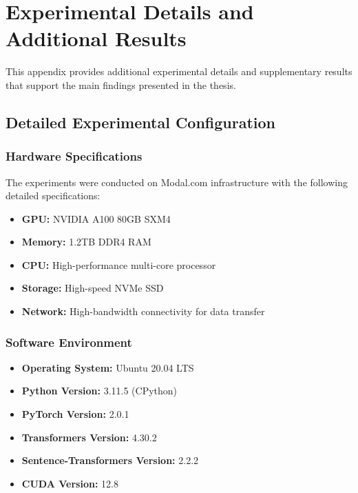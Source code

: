 
\chapter{Experimental Details and Additional Results} %

\label{AppendixA} %


This appendix provides additional experimental details and supplementary results that support the main findings presented in the thesis.

\section{Detailed Experimental Configuration}

\subsection{Hardware Specifications}

The experiments were conducted on Modal.com infrastructure with the following detailed specifications:

\begin{itemize}
\item \textbf{GPU:} NVIDIA A100 80GB SXM4
\item \textbf{Memory:} 1.2TB DDR4 RAM
\item \textbf{CPU:} High-performance multi-core processor
\item \textbf{Storage:} High-speed NVMe SSD
\item \textbf{Network:} High-bandwidth connectivity for data transfer
\end{itemize}

\subsection{Software Environment}

\begin{itemize}
\item \textbf{Operating System:} Ubuntu 20.04 LTS
\item \textbf{Python Version:} 3.11.5 (CPython)
\item \textbf{PyTorch Version:} 2.0.1
\item \textbf{Transformers Version:} 4.30.2
\item \textbf{Sentence-Transformers Version:} 2.2.2
\item \textbf{CUDA Version:} 12.8
\end{itemize}

